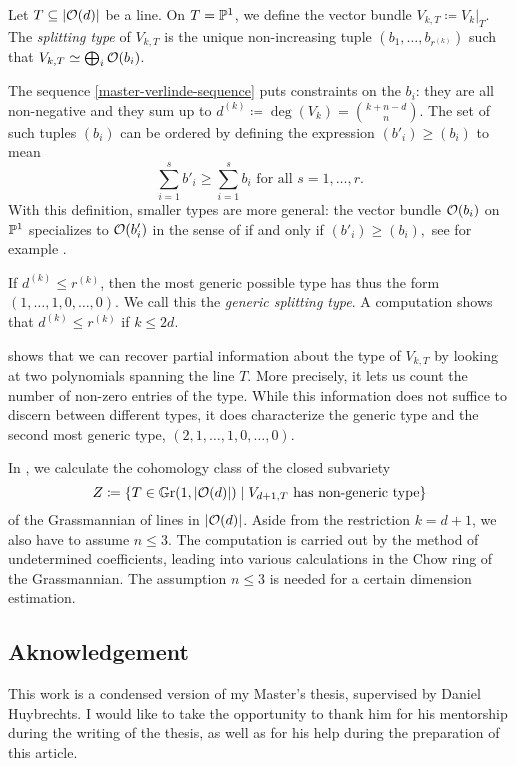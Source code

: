 \begin{definition} Let $T\subseteq \lvert\mathcal{O}(d)\rvert$ be a line. On $T=\mathbb{P}^1$, we define the vector bundle $V_{k,T}\coloneqq V_k|_T$. The \emph{splitting type} of $V_{k,T}$ is the unique non-increasing tuple $(b_1,\dotsc, b_{r^{(k)}})$ such that $V_{k,T} \simeq \bigoplus_i \mathcal{O}(b_i)$.
\end{definition}

The sequence \cref{master-verlinde-sequence} puts constraints on the $b_i$: they are all non-negative and they sum up to $d^{(k)}\coloneqq\deg (V_k) = \binom{k+n-d}{n}$. The set of such tuples $(b_i)$ can be ordered by defining the expression $(b'_i) \geq (b_i)$ to mean
	\[
		\sum_{i=1}^s b'_i \geq \sum_{i=1}^s b_i \text{ for all $s=1,\dotsc, r$}.
	\]
With this definition, smaller types are more general: the vector bundle $\mathcal{O} (b_i)$ on $\mathbb{P}^1$ specializes to $\mathcal{O} (b'_i)$ in the sense of \cite{schatz-degeneration-specialization} if and only if $(b'_i) \geq (b_i),$ see for example \cite{ramamathan-deformations}. 

If $d^{(k)} \leq r^{(k)}$, then the most generic possible type has thus the form $(1,\dotsc,1,0,\dotsc,0)$. We call this the \emph{generic splitting type}. A computation shows that $d^{(k)} \leq r^{(k)}$ if $k\leq 2d$.

 shows that we can recover partial information about the type of $V_{k,T}$ by looking at two polynomials spanning the line $T$. More precisely, it lets us count the number of non-zero entries of the type. While this information does not suffice to discern between different types, it does characterize the generic type and the second most generic type, $(2,1,\dotsc,1,0,\dotsc,0)$.

In , we calculate the cohomology class of the closed subvariety
\[
	Z\coloneqq \{T\in \mathbb G \mathrm r(1,\lvert\mathcal{O}(d)\rvert)\mid V_{d+1,T} \text{ has non-generic type}\}
\]
of the Grassmannian of lines in $\lvert\mathcal{O}(d)\rvert$. Aside from the restriction $k=d+1$, we also have to assume $n\leq 3$. The computation is carried out by the method of undetermined coefficients, leading into various calculations in the Chow ring of the Grassmannian. The assumption $n\leq 3$ is needed for a certain dimension estimation.

\subsection*{Aknowledgement}
This work is a condensed version of my Master's thesis, supervised by Daniel Huybrechts. I would like to take the opportunity to thank him for his mentorship during the writing of the thesis, as well as for his help during the preparation of this article.

